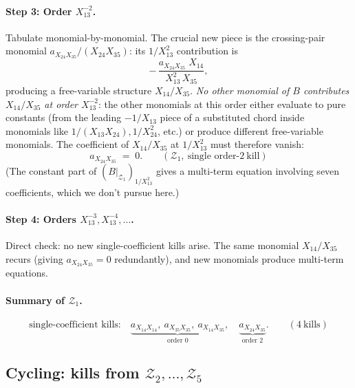 \documentclass[11pt]{article}
\newcommand{\Zr}{\mathcal{Z}}
\begin{document}
\paragraph{Step 3: Order $X_{13}^{-2}$.}
Tabulate monomial-by-monomial. The crucial new piece is the
crossing-pair monomial $a_{X_{24} X_{35}}/(X_{24} X_{35})$: its
$1/X_{13}^2$ contribution is
\[
-\,\frac{a_{X_{24} X_{35}}\; X_{14}}{X_{13}^2\, X_{35}},
\]
producing a free-variable structure $X_{14}/X_{35}$. \emph{No other
monomial of $B$ contributes $X_{14}/X_{35}$ at order $X_{13}^{-2}$}:
the other monomials at this order either evaluate to pure constants
(from the leading $-1/X_{13}$ piece of a substituted chord inside
monomials like $1/(X_{13} X_{24}), 1/X_{24}^2$, etc.) or produce
different free-variable monomials. The coefficient of $X_{14}/X_{35}$
at $1/X_{13}^2$ must therefore vanish:
\[
\boxed{a_{X_{24} X_{35}} \;=\; 0. \qquad (\Zr_1,\ \text{single order-}2\ \text{kill})}
\]
(The constant part of $(B|_{\Zr_1})_{1/X_{13}^2}$ gives a multi-term
equation involving seven coefficients, which we don't pursue here.)

\paragraph{Step 4: Orders $X_{13}^{-3}, X_{13}^{-4}, \dots$.}
Direct check: no new single-coefficient kills arise. The same monomial
$X_{14}/X_{35}$ recurs (giving $a_{X_{24} X_{35}} = 0$ redundantly),
and new monomials produce multi-term equations.

\paragraph{Summary of $\Zr_1$.}
\[
\text{single-coefficient kills:}\quad
\underbrace{a_{X_{14} X_{14}},\ a_{X_{35} X_{35}},\ a_{X_{14} X_{35}}}_{\text{order 0}},
\quad
\underbrace{a_{X_{24} X_{35}}}_{\text{order 2}}.
\qquad (4\ \text{kills})
\]

\subsection{Cycling: kills from $\Zr_2, \dots, \Zr_5$}
\end{document}
